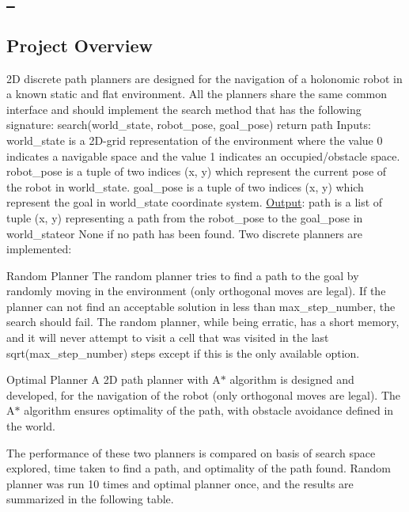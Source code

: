\subsection*{\href{https://travis-ci.com/ajeetwankhede/Discrete-planner-for-motion-planning}\texttt{ } }

\subsection*{Project Overview}

2D discrete path planners are designed for the navigation of a holonomic robot in a known static and flat environment. All the planners share the same common interface and should implement the ​search​ method that has the following signature\+: search(world\+\_\+state, robot\+\_\+pose, goal\+\_\+pose) return path Inputs\+: world\+\_\+state is a 2D-\/grid representation of the environment where the value 0 indicates a navigable space and the value 1 indicates an occupied/obstacle space. robot\+\_\+pose is a tuple of two indices (x, y) which represent the current pose of the robot in world\+\_\+state​. goal\+\_\+pose​ ​is a tuple of two indices (x, y) which represent the goal in ​world\+\_\+state coordinate system. \mbox{\hyperlink{classOutput}{Output}}\+: path is a list of tuple (x, y) representing a path from the ​robot\+\_\+pose to the goal\+\_\+pose​ in world\+\_\+state​ or​ None​ if no path has been found. Two discrete planners are implemented\+:


\begin{DoxyEnumerate}
\item Random Planner The random planner tries to find a path to the goal by randomly moving in the environment (only orthogonal moves are legal). If the planner can not find an acceptable solution in less than max\+\_\+step\+\_\+number, the search should fail. The random planner, while being erratic, has a short memory, and it will never attempt to visit a cell that was visited in the last ​sqrt(max\+\_\+step\+\_\+number)​ steps except if this is the only available option.
\item Optimal Planner A 2D path planner with A$\ast$ algorithm is designed and developed, for the navigation of the robot (only orthogonal moves are legal). The A$\ast$ algorithm ensures optimality of the path, with obstacle avoidance defined in the world.
\end{DoxyEnumerate}

The performance of these two planners is compared on basis of search space explored, time taken to find a path, and optimality of the path found. Random planner was run 10 times and optimal planner once, and the results are summarized in the following table.

